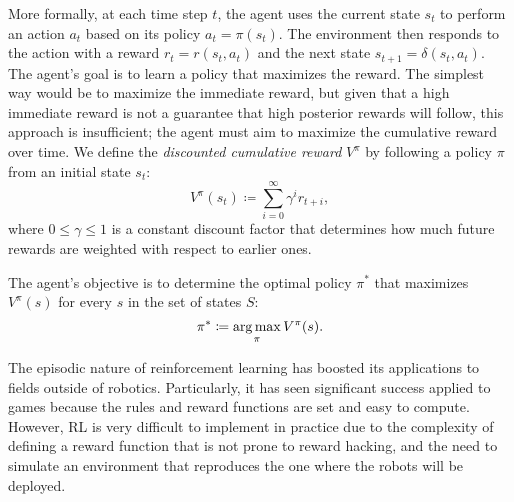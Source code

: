 More formally, at each time step $t$, the agent uses the current state $s_t$ to perform an action $a_t$ based on its policy $a_t=\pi(s_t)$. The environment then responds to the action with a reward $r_t=r(s_t, a_t)$ and the next state $s_{t+1}=\delta(s_t, a_t)$. The agent's goal is to learn a policy that maximizes the reward. The simplest way would be to maximize the immediate reward, but given that a high immediate reward is not a guarantee that high posterior rewards will follow, this approach is insufficient; the agent must aim to maximize the cumulative reward over time. We define the \textit{discounted cumulative reward} $V^\pi$ by following a policy $\pi$ from an initial state $s_t$:
\begin{equation*}
    V^\pi(s_t) \coloneq \sum^\infty_{i=0}\gamma^i r_{t+i},
\end{equation*}
where $0 \leq \gamma \leq 1$ is a constant discount factor that determines how much future rewards are weighted with respect to earlier ones. 

The agent's objective is to determine the optimal policy $\pi^*$ that maximizes $V^\pi(s)$ for every $s$ in the set of states $S$:
\begin{equation*}
    \pi^* \coloneq \operatorname*{arg\,max}_\pi V^\pi (s).
\end{equation*}

The episodic nature of reinforcement learning has boosted its applications to fields outside of robotics. Particularly, it has seen significant success applied to games because the rules and reward functions are set and easy to compute. However, RL is very difficult to implement in practice due to the complexity of defining a reward function that is not prone to reward hacking, and the need to simulate an environment that reproduces the one where the robots will be deployed.

